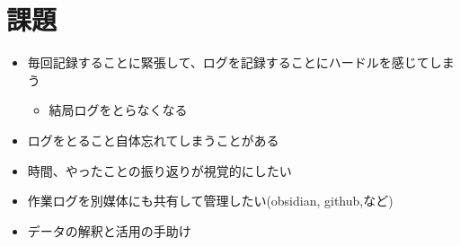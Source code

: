 \section{課題} \label{sec:assigment}

\begin{itemize}
  \item 毎回記録することに緊張して、ログを記録することにハードルを感じてしまう
  \begin{itemize}
    \item 結局ログをとらなくなる
  \end{itemize}
  \item ログをとること自体忘れてしまうことがある
  \item 時間、やったことの振り返りが視覚的にしたい
  \item 作業ログを別媒体にも共有して管理したい(obsidian, github,など)
  \item データの解釈と活用の手助け
\end{itemize}

